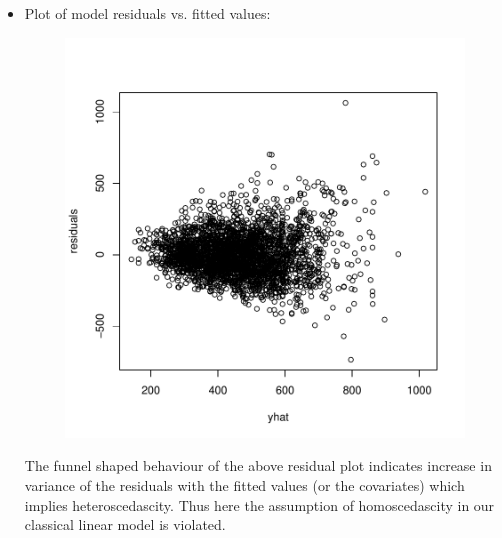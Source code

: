 \documentclass[12pt]{article}
\begin{document}
\begin{itemize}
\item Plot of model residuals vs. fitted values:
\begin{figure}[H]
\begin{Schunk}
\end{Schunk}
\includegraphics{HW3-032}
\end{figure}
The funnel shaped behaviour of the above residual plot indicates increase in variance of the residuals with the fitted values (or the covariates) which implies heteroscedascity. Thus here the assumption of homoscedascity in our classical linear model is violated.
\clearpage


\end{itemize}
\end{document}
